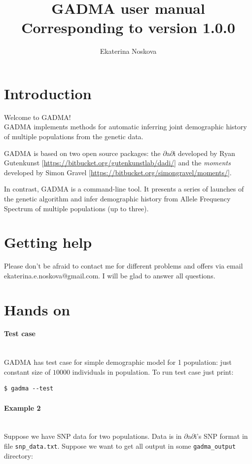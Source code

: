 \documentclass[12pt]{article}
\title{GADMA user manual \\ \normalsize  Corresponding to version 1.0.0}
\author{Ekaterina Noskova}
\date{}
\makeatletter
\newcommand{\dadi}{$\partial$a$\partial$i\xspace}
\newcommand{\moments}{\textit{moments}\xspace}
\newcommand{\py}[1]{\lstinline[language=Python, showstringspaces=False]@#1@}
\makeatother
\begin{document}
\maketitle
\tableofcontents
\clearpage


\section{Introduction}
Welcome to GADMA!\\

GADMA implements methods for automatic inferring joint demographic history of multiple populations from the genetic data.

GADMA is based on two open source packages: the \dadi developed by Ryan Gutenkunst [\url{https://bitbucket.org/gutenkunstlab/dadi/}] and the \moments developed by Simon Gravel [\url{https://bitbucket.org/simongravel/moments/}].

In contrast, GADMA is a command-line tool. It presents a series of launches of the genetic algorithm and infer demographic history from Allele Frequency Spectrum of multiple populations (up to three).

\section{Getting help}
Please don't be afraid to contact me for different problems and offers via email ekaterina.e.noskova@gmail.com. I will be glad to answer all questions. 

\section{Hands on}
\paragraph{Test case}\mbox{}\\
GADMA has test case for simple demographic model for 1 population: just constant size of $10000$ individuals in population. To run test case just print:

\begin{lstlisting}
$ gadma --test
\end{lstlisting}

\paragraph{Example 2}\mbox{}\\
Suppose we have SNP data for two populations. Data is in \dadi's SNP format in file \py{snp_data.txt}. Suppose we want to get all output in some \py{gadma_output} directory:
\end{document}
